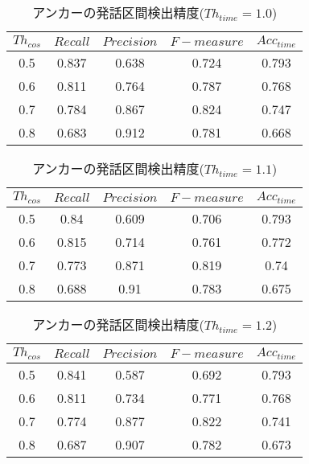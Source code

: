 \begin{table}[H]
  \begin{center}
    \caption{アンカーの発話区間検出精度($Th_{time}=1.0$) \label{table:result_get_anchor10}}
    \begin{tabular}{|c||c|c|c|c|} \hline
      $Th_{cos}$ & $Recall$ & $Precision$ & $F-measure$ & $Acc_{time}$\\ \hline
0.5 & 0.837 & 0.638 & 0.724 & 0.793 \\ \hline
0.6 & 0.811 & 0.764 & 0.787 & 0.768 \\ \hline
0.7 & 0.784 & 0.867 & 0.824 & 0.747 \\ \hline
0.8 & 0.683 & 0.912 & 0.781 & 0.668 \\ \hline

    \end{tabular}
  \end{center}
\end{table}

\begin{table}[H]
  \begin{center}
    \caption{アンカーの発話区間検出精度($Th_{time}=1.1$) \label{table:result_get_anchor11}}
    \begin{tabular}{|c||c|c|c|c|} \hline
      $Th_{cos}$ & $Recall$ & $Precision$ & $F-measure$ & $Acc_{time}$\\ \hline
0.5 & 0.84 & 0.609 & 0.706 & 0.793 \\ \hline
0.6 & 0.815 & 0.714 & 0.761 & 0.772 \\ \hline
0.7 & 0.773 & 0.871 & 0.819 & 0.74 \\ \hline
0.8 & 0.688 & 0.91 & 0.783 & 0.675 \\ \hline

    \end{tabular}
  \end{center}
\end{table}


\begin{table}[H]
  \begin{center}
    \caption{アンカーの発話区間検出精度($Th_{time}=1.2$) \label{table:result_get_anchor12}}
    \begin{tabular}{|c||c|c|c|c|} \hline
      $Th_{cos}$ & $Recall$ & $Precision$ & $F-measure$ & $Acc_{time}$\\ \hline
0.5 & 0.841 & 0.587 & 0.692 & 0.793 \\ \hline
0.6 & 0.811 & 0.734 & 0.771 & 0.768 \\ \hline
0.7 & 0.774 & 0.877 & 0.822 & 0.741 \\ \hline
0.8 & 0.687 & 0.907 & 0.782 & 0.673 \\ \hline

    \end{tabular}
  \end{center}
\end{table}

